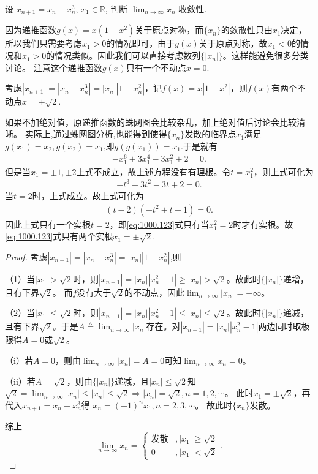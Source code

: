 \documentclass[../../main.tex]{subfiles}%
\begin{document}
\begin{example}
设 $x_{n+1} = x_n - x_n^3$, $x_1 \in \mathbb{R}$, 判断 $\lim_{n \to \infty} x_n$ 收敛性.
\end{example}
\begin{note}
因为递推函数$g(x) = x(1 - x^2)$关于原点对称，而$\{ x_n \}$的敛散性只由$x_1$决定，所以我们只需要考虑$x_1 > 0$的情况即可，由于$g(x)$关于原点对称，故$x_1 < 0$的情况和$x_1 > 0$的情况类似。因此我们可以直接考虑数列$\{ |x_n| \}$。这样能避免很多分类讨论。
注意这个递推函数$g(x)$只有一个不动点$x=0$.

考虑$|x_{n+1}| = |x_n - x_n^3| = |x_n| |1 - x_n^2|$，记$f(x) = x |1 - x^2|$，则$f(x)$有两个不动点$x=\pm \sqrt{2}.$

如果不加绝对值，原递推函数的蛛网图会比较杂乱，加上绝对值后讨论会比较清晰。
实际上,通过蛛网图分析,也能得到使得$\{x_n\}$发散的临界点$x_1$满足$g(x_1)=x_2,g(x_2)=x_1$,即$g(g(x_1))=x_1$.于是就有
\begin{align}
-x_1^6 + 3x_1^4 - 3x_1^2 + 2 = 0.\label{eq:1000.123}
\end{align}
但是当$x_1 = \pm 1, \pm 2$上式不成立，故上述方程没有有理根。令$t = x_1^2$，则上式可化为
\begin{align*}
-t^3 + 3t^2 - 3t + 2 = 0.
\end{align*}
当$t = 2$时，上式成立。故上式可化为
\begin{align*}
(t - 2)(-t^2 + t - 1) = 0.
\end{align*}
因此上式只有一个实根$t = 2$，即\eqref{eq:1000.123}式只有当$x_1^2 = 2$时才有实根。故\eqref{eq:1000.123}式只有两个实根$x_1 = \pm \sqrt{2}$.
\end{note}
\begin{proof}
考虑$|x_{n+1}| = |x_n - x_n^3| = |x_n| |1 - x_n^2|$,则

（1）当$|x_1| > \sqrt{2}$时，则$|x_{n+1}| = |x_n| |x_n^2 - 1| \geqslant |x_n| > \sqrt{2}$。故此时$\{ |x_n| \}$递增，且有下界$\sqrt{2}$。
而$f$没有大于$\sqrt{2}$的不动点，因此$\lim_{n \to \infty} |x_n| = +\infty$。

（2）当$|x_1| \leqslant \sqrt{2}$时，则$|x_{n+1}| = |x_n| |x_n^2 - 1| \leqslant |x_n| \leqslant \sqrt{2}$。故此时$\{ |x_n| \}$递减，且有下界$\sqrt{2}$。于是$A \triangleq \lim_{n \to \infty} |x_n|$存在。对$|x_{n+1}| = |x_n| |x_n^2 - 1|$两边同时取极限得$A = 0$或$\sqrt{2}$。

（i）若$A = 0$，则由$\lim_{n \to \infty} |x_n| = A = 0$可知$\lim_{n \to \infty} x_n = 0$。

（ii）若$A = \sqrt{2}$，则由$\{ |x_n| \}$递减，且$|x_n| \leqslant \sqrt{2}$知
$\sqrt{2} = \lim_{n \to \infty} |x_n| \leqslant |x_n| \leqslant \sqrt{2} \Rightarrow |x_n| = \sqrt{2}, n = 1, 2, \cdots$。
此时$x_1 = \pm \sqrt{2}$，再代入$x_{n+1} = x_n - x_n^3$得
$x_n = (-1)^n x_1, n = 2, 3, \cdots$。
故此时$\{ x_n \}$发散。

综上
$$\lim_{n \to \infty} x_n = \begin{cases} \text{发散}&, |x_1| \geqslant \sqrt{2} \\ 0&,|x_1| < \sqrt{2} \end{cases}.$$
\end{proof}
\end{document}
